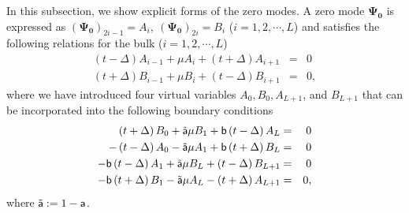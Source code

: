 \documentclass[aps, prb, showpacs, twocolumn, %
amssymb,superscriptaddress]{revtex4}
\begin{document}
In this subsection, we show explicit forms of the zero modes. A zero mode $\bm{\Psi_{0}}$ is expressed as $\left( \bm{\Psi_{0}} \right)_{2i-1} = A_{i},~\left( \bm{\Psi_{0}} \right)_{2i} = B_{i}$ ($i=1,2,\cdots,L$) and satisfies the following relations for the bulk ($i=1,2, \cdots , L$)
\begin{eqnarray}
\left( t - \Delta \right) A_{i-1} + \mu A_{i} + \left( t + \Delta \right) A_{i+1} &=& 0 \nonumber \\
\left( t + \Delta \right) B_{i-1} + \mu B_{i} + \left( t - \Delta \right) B_{i+1} &=& 0,
	\label{zero modes bulk}
\end{eqnarray}
where we have introduced four virtual variables $A_{0}, B_{0}, A_{L+1}$, and $B_{L+1}$ that can be incorporated into the following boundary conditions
\begin{eqnarray}
\left( t+\Delta \right) B_{0} + \tilde{\sf a} \mu B_{1} + {\sf b} \left( t - \Delta \right) A_{L} &=& 0 \nonumber \\
- \left( t-\Delta \right) A_{0} - \tilde{\sf a} \mu A_{1} + {\sf b} \left( t+\Delta \right) B_{L} &=& 0 \nonumber \\
- {\sf b} \left( t - \Delta \right) A_{1} + \tilde{\sf a} \mu B_{L} + \left( t-\Delta \right) B_{L+1} &=& 0 \nonumber \\
-{\sf b} \left( t + \Delta \right) B_{1} - \tilde{\sf a} \mu A_{L} - \left( t+\Delta \right) A_{L+1} &=& 0,
\label{bc}
\end{eqnarray}
where $\tilde{\sf a} := 1 - {\sf a}$.
\end{document}
